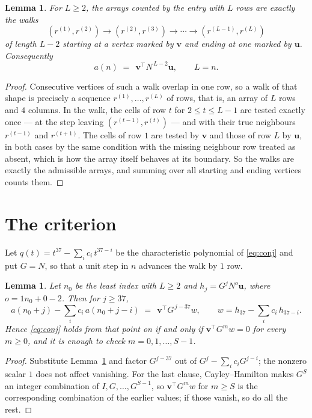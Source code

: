 \documentclass[11pt,a4paper]{article}
\theoremstyle{plain}
\newtheorem{lemma}[theorem]{Lemma}
\theoremstyle{definition}
\begin{document}
\begin{lemma}\label{lem:walk}
For $L\ge2$, the arrays counted by the entry with $L$ rows are exactly the walks
\[
(r^{(1)},r^{(2)})\to(r^{(2)},r^{(3)})\to\cdots\to(r^{(L-1)},r^{(L)})
\]
of length $L-2$ starting at a vertex marked by $\mathbf{v}$ and ending at one marked by
$\mathbf{u}$. Consequently
\[
a(n)\;=\;\,\mathbf{v}^{\!\top}N^{\,L-2}\mathbf{u},\qquad L=n .
\]
\end{lemma}

\begin{proof}
Consecutive vertices of such a walk overlap in one row, so a walk of that shape is
precisely a sequence $r^{(1)},\dots,r^{(L)}$ of rows, that is, an array of $L$ rows
and $4$ columns. In the walk, the cells of row $t$ for $2\le t\le L-1$ are tested
exactly once --- at the step leaving $(r^{(t-1)},r^{(t)})$ --- and with their true
neighbours $r^{(t-1)}$ and $r^{(t+1)}$. The cells of row $1$ are tested by
$\mathbf{v}$ and those of row $L$ by $\mathbf{u}$, in both cases by the same condition
with the missing neighbour row treated as absent, which is how the array itself behaves at
its boundary. So the walks are exactly the admissible arrays, and summing over all starting
and ending vertices counts them.
\end{proof}

\section{The criterion}

Let $q(t)=t^{37}-\sum_i c_i\,t^{37-i}$ be the characteristic polynomial of
\eqref{eq:conj} and put $G=N$, so that a unit step in $n$ advances the walk by
$1$ row.

\begin{lemma}\label{lem:crit}
Let $n_0$ be the least index with $L\ge2$ and $h_j=G^{j}N^{o}\mathbf{u}$, where
$o=1n_0+0-2$. Then for $j\ge37$,
\[
a(n_0+j)-\sum_i c_i\,a(n_0+j-i)\;=\;\,\mathbf{v}^{\!\top}G^{\,j-37}w,
\qquad w=h_{37}-\sum_i c_i\,h_{37-i} .
\]
Hence \eqref{eq:conj} holds from that point on if and only if
$\mathbf{v}^{\!\top}G^{m}w=0$ for every $m\ge0$, and it is enough to check
$m=0,1,\dots,S-1$.
\end{lemma}

\begin{proof}
Substitute Lemma~\ref{lem:walk} and factor $G^{j-37}$ out of
$G^{j}-\sum_ic_iG^{j-i}$; the nonzero scalar $1$ does not affect
vanishing. For the last clause, Cayley--Hamilton makes $G^{S}$ an integer combination of
$I,G,\dots,G^{S-1}$, so $\mathbf{v}^{\!\top}G^{m}w$ for $m\ge S$ is the corresponding
combination of the earlier values; if those vanish, so do all the rest.
\end{proof}
\end{document}
